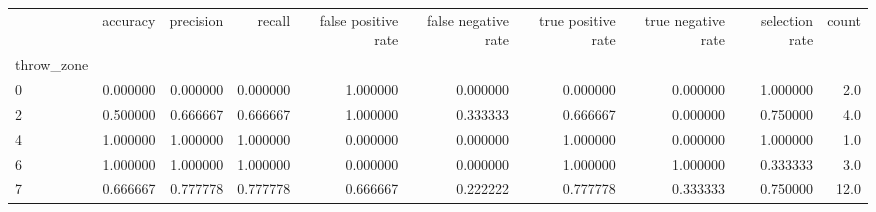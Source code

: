 \begin{tabular}{lrrrrrrrrr}
\toprule
{} &  accuracy &  precision &    recall &  false positive rate &  false negative rate &  true positive rate &  true negative rate &  selection rate &  count \\
throw\_zone &           &            &           &                      &                      &                     &                     &                 &        \\
\midrule
0          &  0.000000 &   0.000000 &  0.000000 &             1.000000 &             0.000000 &            0.000000 &            0.000000 &        1.000000 &    2.0 \\
2          &  0.500000 &   0.666667 &  0.666667 &             1.000000 &             0.333333 &            0.666667 &            0.000000 &        0.750000 &    4.0 \\
4          &  1.000000 &   1.000000 &  1.000000 &             0.000000 &             0.000000 &            1.000000 &            0.000000 &        1.000000 &    1.0 \\
6          &  1.000000 &   1.000000 &  1.000000 &             0.000000 &             0.000000 &            1.000000 &            1.000000 &        0.333333 &    3.0 \\
7          &  0.666667 &   0.777778 &  0.777778 &             0.666667 &             0.222222 &            0.777778 &            0.333333 &        0.750000 &   12.0 \\
\bottomrule
\end{tabular}
